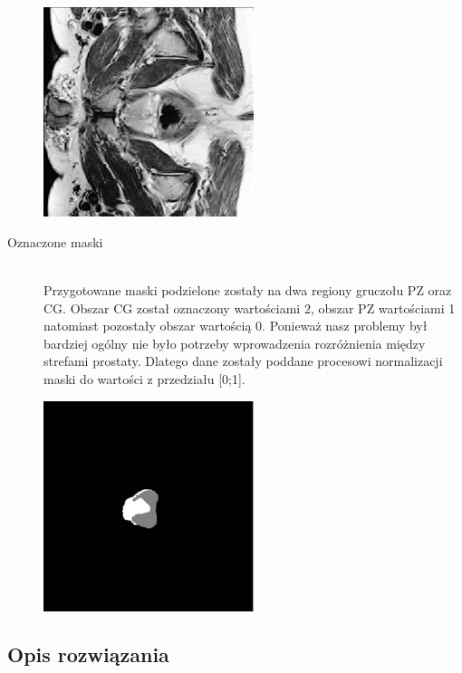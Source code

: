 \documentclass[a4paper,11pt,twoside]{report}
\theoremstyle{definition}
\begin{document}
\begin{description}
	\begin{minipage}[h]{\linewidth}
		\centering
		\includegraphics[width=0.5\textwidth,angle=270,origin=c]{segmentation/example_MRI_image.png}
	\end{minipage}


	\item [Oznaczone maski] \hfill \\
Przygotowane maski podzielone zostały na dwa regiony gruczołu PZ oraz CG. Obszar CG został oznaczony wartościami 2, obszar PZ wartościami 1 natomiast pozostały obszar wartością 0.  Ponieważ nasz problemy był bardziej ogólny nie było potrzeby wprowadzenia rozróżnienia między strefami prostaty. Dlatego dane zostały poddane procesowi normalizacji maski do wartości z przedziału [0;1].

\begin{minipage}[h]{\linewidth}
	\centering
	\includegraphics[width=0.5\textwidth,angle=270,origin=c]{segmentation/example_mask.png}
\end{minipage}


\end{description}

\subsection{Opis rozwiązania}
\end{document}
